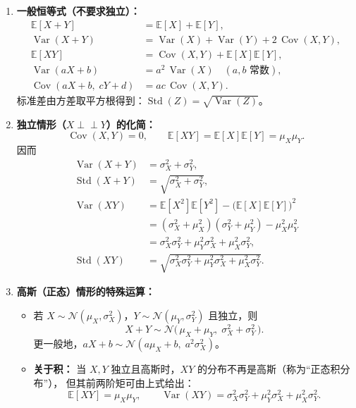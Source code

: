 \documentclass[../main.tex]{subfiles}
\begin{document}
\begin{enumerate}
    \begin{enumerate}
      \item \textbf{一般恒等式（不要求独立）：}
      \begin{align}
        \mathbb{E}[X+Y] &= \mathbb{E}[X]+\mathbb{E}[Y],\\
        \operatorname{Var}(X+Y) &= \operatorname{Var}(X)+\operatorname{Var}(Y)+2\,\operatorname{Cov}(X,Y),\\
        \mathbb{E}[XY] &= \operatorname{Cov}(X,Y)+\mathbb{E}[X]\mathbb{E}[Y],\\
        \operatorname{Var}(aX+b) &= a^2\,\operatorname{Var}(X)\quad(\text{$a,b$ 常数}),\\
        \operatorname{Cov}(aX+b,\;cY+d) &= ac\,\operatorname{Cov}(X,Y).
      \end{align}
      标准差由方差取平方根得到：$\operatorname{Std}(Z)=\sqrt{\operatorname{Var}(Z)}$。
    
      \item \textbf{独立情形（$X \perp\!\!\!\perp Y$）的化简：}
      \[
        \operatorname{Cov}(X,Y)=0,\qquad
        \mathbb{E}[XY]=\mathbb{E}[X]\mathbb{E}[Y]=\mu_X\mu_Y.
      \]
      因而
      \begin{align}
        \operatorname{Var}(X+Y) &= \sigma_X^2+\sigma_Y^2,\\
        \operatorname{Std}(X+Y) &= \sqrt{\sigma_X^2+\sigma_Y^2},\\
        \operatorname{Var}(XY) &= \mathbb{E}[X^2]\mathbb{E}[Y^2]-\big(\mathbb{E}[X]\mathbb{E}[Y]\big)^2 \nonumber\\
          &= (\sigma_X^2+\mu_X^2)(\sigma_Y^2+\mu_Y^2)-\mu_X^2\mu_Y^2 \nonumber\\
          &= \sigma_X^2\sigma_Y^2+\mu_Y^2\sigma_X^2+\mu_X^2\sigma_Y^2,\\
        \operatorname{Std}(XY) &= \sqrt{\sigma_X^2\sigma_Y^2+\mu_Y^2\sigma_X^2+\mu_X^2\sigma_Y^2}.
      \end{align}
    
      \item \textbf{高斯（正态）情形的特殊运算：}
      \begin{itemize}
        \item 若 $X\sim\mathcal{N}(\mu_X,\sigma_X^2)$，$Y\sim\mathcal{N}(\mu_Y,\sigma_Y^2)$ 且独立，则
        \[
          X+Y \sim \mathcal{N}\big(\,\mu_X+\mu_Y,\;\sigma_X^2+\sigma_Y^2\,\big).
        \]
        更一般地，$aX+b \sim \mathcal{N}(a\mu_X+b,\;a^2\sigma_X^2)$。
        \item \textbf{关于积：} 当 $X,Y$ 独立且高斯时，$XY$ 的分布不再是高斯（称为“正态积分布”），
        但其前两阶矩可由上式给出：
        \[
          \mathbb{E}[XY]=\mu_X\mu_Y,\qquad
          \operatorname{Var}(XY)=\sigma_X^2\sigma_Y^2+\mu_Y^2\sigma_X^2+\mu_X^2\sigma_Y^2.
        \]
      \end{itemize}


\end{enumerate}
\end{enumerate}
\end{document}
